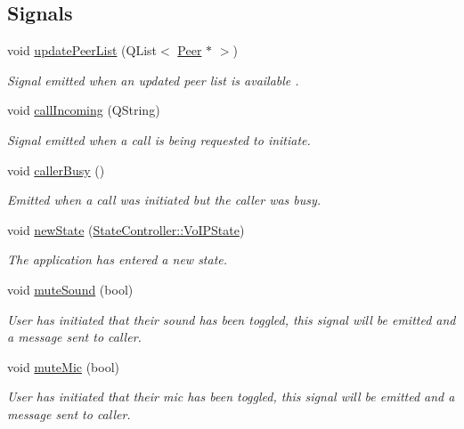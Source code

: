\subsection*{\-Signals}
\begin{DoxyCompactItemize}
\item 
void \hyperlink{class_state_controller_a6db599925ca114fd1f1d0204a8de75ec}{update\-Peer\-List} (\-Q\-List$<$ \hyperlink{class_peer}{\-Peer} $\ast$ $>$)
\begin{DoxyCompactList}\small\item\em \-Signal emitted when an updated peer list is available . \end{DoxyCompactList}\item 
void \hyperlink{class_state_controller_aaf4d11ecaef3d8872a9c93b5b3e5af3b}{call\-Incoming} (\-Q\-String)
\begin{DoxyCompactList}\small\item\em \-Signal emitted when a call is being requested to initiate. \end{DoxyCompactList}\item 
void \hyperlink{class_state_controller_a393dbc547e29ffad28daa44517481ca5}{caller\-Busy} ()
\begin{DoxyCompactList}\small\item\em \-Emitted when a call was initiated but the caller was busy. \end{DoxyCompactList}\item 
void \hyperlink{class_state_controller_acff9d9f23348247c6844f4b198b6ba23}{new\-State} (\hyperlink{class_state_controller_a1aabd2155d8e6feb201ed3941e4ee2be}{\-State\-Controller\-::\-Vo\-I\-P\-State})
\begin{DoxyCompactList}\small\item\em \-The application has entered a new state. \end{DoxyCompactList}\item 
void \hyperlink{class_state_controller_ab7c03a4203338d1f17e95758ad96647c}{mute\-Sound} (bool)
\begin{DoxyCompactList}\small\item\em \-User has initiated that their sound has been toggled, this signal will be emitted and a message sent to caller. \end{DoxyCompactList}\item 
void \hyperlink{class_state_controller_a36e2e98d487e2e195dfc595662f6db9f}{mute\-Mic} (bool)
\begin{DoxyCompactList}\small\item\em \-User has initiated that their mic has been toggled, this signal will be emitted and a message sent to caller. \end{DoxyCompactList}\item 

\end{DoxyCompactItemize}

